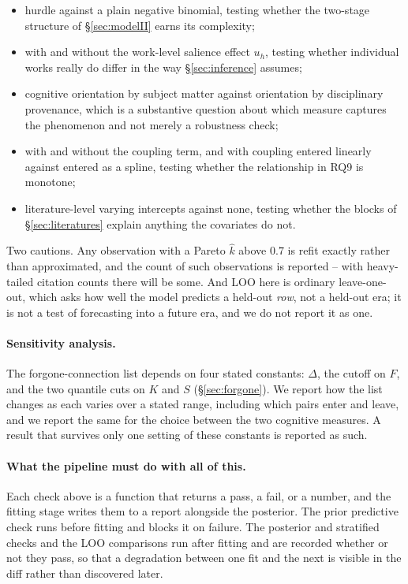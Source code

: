 \documentclass[11pt]{article}
\begin{document}
\begin{itemize}[leftmargin=2em, itemsep=1pt]
  \item hurdle against a plain negative binomial, testing whether the two-stage structure of
        \S\ref{sec:modelII} earns its complexity;
  \item with and without the work-level salience effect $u_h$, testing whether individual
        works really do differ in the way \S\ref{sec:inference} assumes;
  \item cognitive orientation by subject matter against orientation by disciplinary
        provenance, which is a substantive question about which measure captures the
        phenomenon and not merely a robustness check;
  \item with and without the coupling term, and with coupling entered linearly against
        entered as a spline, testing whether the relationship in RQ9 is monotone;
  \item literature-level varying intercepts against none, testing whether the blocks of
        \S\ref{sec:literatures} explain anything the covariates do not.
\end{itemize}

Two cautions. Any observation with a Pareto $\hat{k}$ above $0.7$ is refit exactly rather than
approximated, and the count of such observations is reported -- with heavy-tailed citation
counts there will be some. And LOO here is ordinary leave-one-out, which asks how well the
model predicts a held-out \emph{row}, not a held-out era; it is not a test of forecasting
into a future era, and we do not report it as one.

\paragraph{Sensitivity analysis.} The forgone-connection list depends on four stated
constants: $\Delta$, the cutoff on $F$, and the two quantile cuts on $K$ and $S$
(\S\ref{sec:forgone}). We report how the list changes as each varies over a stated range,
including which pairs enter and leave, and we report the same for the choice between the two
cognitive measures. A result that survives only one setting of these constants is reported as
such.

\paragraph{What the pipeline must do with all of this.} Each check above is a function that
returns a pass, a fail, or a number, and the fitting stage writes them to a report alongside
the posterior. The prior predictive check runs before fitting and blocks it on failure. The
posterior and stratified checks and the LOO comparisons run after fitting and are recorded
whether or not they pass, so that a degradation between one fit and the next is visible in the
diff rather than discovered later.
\end{document}
